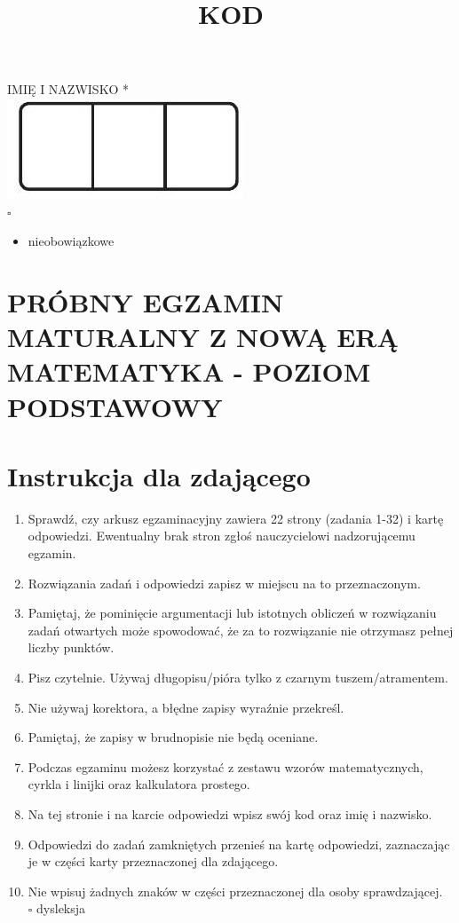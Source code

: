 \documentclass[10pt]{article}
\title{KOD }
\author{}
\date{}
\begin{document}
\maketitle
IMIĘ I NAZWISKO *\\
\includegraphics[max width=\textwidth, center]{2024_11_21_dd21f7544b65bcf1b3c7g-01}\\
\(\square\)

\begin{itemize}
  \item nieobowiązkowe
\end{itemize}

\section*{PRÓBNY EGZAMIN MATURALNY Z NOWĄ ERĄ MATEMATYKA - POZIOM PODSTAWOWY}
\section*{Instrukcja dla zdającego}
\begin{enumerate}
  \item Sprawdź, czy arkusz egzaminacyjny zawiera 22 strony (zadania 1-32) i kartę odpowiedzi. Ewentualny brak stron zgłoś nauczycielowi nadzorującemu egzamin.
  \item Rozwiązania zadań i odpowiedzi zapisz w miejscu na to przeznaczonym.
  \item Pamiętaj, że pominięcie argumentacji lub istotnych obliczeń w rozwiązaniu zadań otwartych może spowodować, że za to rozwiązanie nie otrzymasz pełnej liczby punktów.
  \item Pisz czytelnie. Używaj długopisu/pióra tylko z czarnym tuszem/atramentem.
  \item Nie używaj korektora, a błędne zapisy wyraźnie przekreśl.
  \item Pamiętaj, że zapisy w brudnopisie nie będą oceniane.
  \item Podczas egzaminu możesz korzystać z zestawu wzorów matematycznych, cyrkla i linijki oraz kalkulatora prostego.
  \item Na tej stronie i na karcie odpowiedzi wpisz swój kod oraz imię i nazwisko.
  \item Odpowiedzi do zadań zamkniętych przenieś na kartę odpowiedzi, zaznaczając je w części karty przeznaczonej dla zdającego.
  \item Nie wpisuj żadnych znaków w części przeznaczonej dla osoby sprawdzającej.\\
\(\square\) dysleksja
\end{enumerate}
\end{document}
